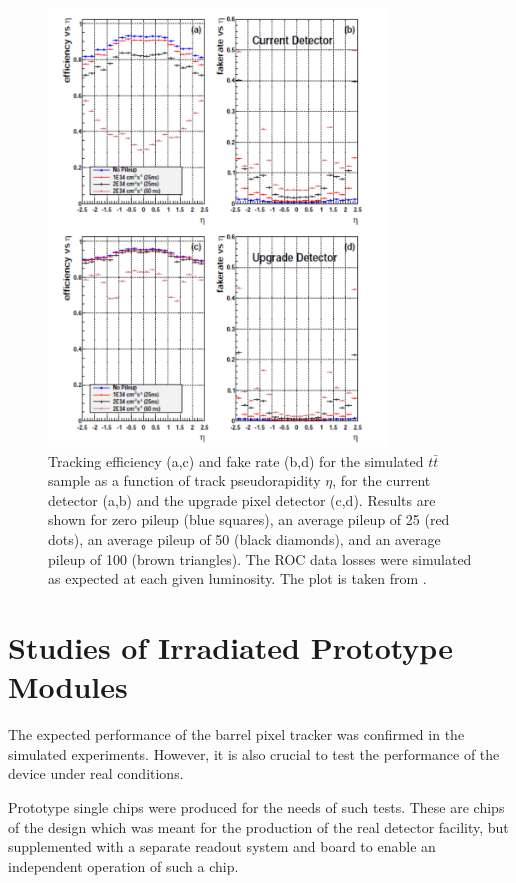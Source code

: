 \begin{figure}[p]
 \centering
 \includegraphics[width=0.8\textwidth]{021_pixel_upgrade/plots/sim_perform.pdf}
 \caption{Tracking efficiency (a,c) and fake rate (b,d) for the simulated $t\bar{t}$ sample as a function of track
          pseudorapidity $\eta$, for the current detector (a,b) and the upgrade pixel detector (c,d). Results are shown for
          zero pileup (blue squares), an average pileup of 25 (red dots), an average pileup of 50 (black
          diamonds), and an average pileup of 100 (brown triangles). The ROC data losses were simulated
          as expected at each given luminosity. The plot is taken from \cite{CMS:2012sda}.}
 \label{fig:sim_perform}
\end{figure}


\section{Studies of Irradiated Prototype Modules}

The expected performance of the barrel pixel tracker was confirmed in the simulated experiments. However, it is also crucial to test 
the performance of the device under real conditions. 

Prototype single chips were produced for the needs of such tests. These are chips of the design which was meant for the production
of the real detector facility, but supplemented with a separate readout system and board to enable an independent operation of such
a chip. 

